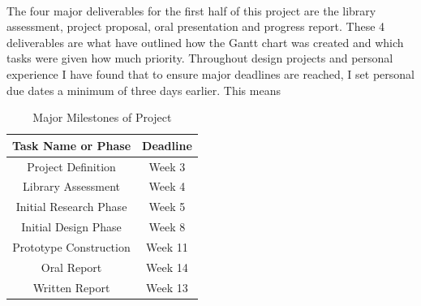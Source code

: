\paragraph{}
The four major deliverables for the first half of this project are the library assessment, project proposal, oral presentation and progress report. These 4 deliverables are what have outlined how the Gantt chart was created and which tasks were given how much priority. Throughout design projects and personal experience I have found that to ensure major deadlines are reached, I set personal due dates a minimum of three days earlier. This means

\begin{table}[h!]
\centering
\begin{tabular}{||c c||} 
 \hline
 Task Name or Phase & Deadline \\ [0.5ex] 
 \hline\hline
 Project Definition & Week 3 \\ 
 Library Assessment & Week 4 \\
 Initial Research Phase & Week 5 \\
 Initial Design Phase & Week 8 \\
 Prototype Construction & Week 11 \\ 
 Oral Report & Week 14 \\
 Written Report & Week 13 \\ [1ex] 
 \hline
\end{tabular}
\caption{Major Milestones of Project}
\label{table:1}
\end{table}  

\newpage